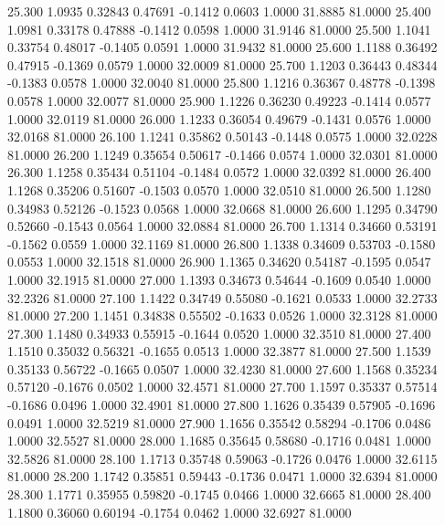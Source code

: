   25.300   1.0935   0.32843   0.47691  -0.1412   0.0603   1.0000  31.8885  81.0000
  25.400   1.0981   0.33178   0.47888  -0.1412   0.0598   1.0000  31.9146  81.0000
  25.500   1.1041   0.33754   0.48017  -0.1405   0.0591   1.0000  31.9432  81.0000
  25.600   1.1188   0.36492   0.47915  -0.1369   0.0579   1.0000  32.0009  81.0000
  25.700   1.1203   0.36443   0.48344  -0.1383   0.0578   1.0000  32.0040  81.0000
  25.800   1.1216   0.36367   0.48778  -0.1398   0.0578   1.0000  32.0077  81.0000
  25.900   1.1226   0.36230   0.49223  -0.1414   0.0577   1.0000  32.0119  81.0000
  26.000   1.1233   0.36054   0.49679  -0.1431   0.0576   1.0000  32.0168  81.0000
  26.100   1.1241   0.35862   0.50143  -0.1448   0.0575   1.0000  32.0228  81.0000
  26.200   1.1249   0.35654   0.50617  -0.1466   0.0574   1.0000  32.0301  81.0000
  26.300   1.1258   0.35434   0.51104  -0.1484   0.0572   1.0000  32.0392  81.0000
  26.400   1.1268   0.35206   0.51607  -0.1503   0.0570   1.0000  32.0510  81.0000
  26.500   1.1280   0.34983   0.52126  -0.1523   0.0568   1.0000  32.0668  81.0000
  26.600   1.1295   0.34790   0.52660  -0.1543   0.0564   1.0000  32.0884  81.0000
  26.700   1.1314   0.34660   0.53191  -0.1562   0.0559   1.0000  32.1169  81.0000
  26.800   1.1338   0.34609   0.53703  -0.1580   0.0553   1.0000  32.1518  81.0000
  26.900   1.1365   0.34620   0.54187  -0.1595   0.0547   1.0000  32.1915  81.0000
  27.000   1.1393   0.34673   0.54644  -0.1609   0.0540   1.0000  32.2326  81.0000
  27.100   1.1422   0.34749   0.55080  -0.1621   0.0533   1.0000  32.2733  81.0000
  27.200   1.1451   0.34838   0.55502  -0.1633   0.0526   1.0000  32.3128  81.0000
  27.300   1.1480   0.34933   0.55915  -0.1644   0.0520   1.0000  32.3510  81.0000
  27.400   1.1510   0.35032   0.56321  -0.1655   0.0513   1.0000  32.3877  81.0000
  27.500   1.1539   0.35133   0.56722  -0.1665   0.0507   1.0000  32.4230  81.0000
  27.600   1.1568   0.35234   0.57120  -0.1676   0.0502   1.0000  32.4571  81.0000
  27.700   1.1597   0.35337   0.57514  -0.1686   0.0496   1.0000  32.4901  81.0000
  27.800   1.1626   0.35439   0.57905  -0.1696   0.0491   1.0000  32.5219  81.0000
  27.900   1.1656   0.35542   0.58294  -0.1706   0.0486   1.0000  32.5527  81.0000
  28.000   1.1685   0.35645   0.58680  -0.1716   0.0481   1.0000  32.5826  81.0000
  28.100   1.1713   0.35748   0.59063  -0.1726   0.0476   1.0000  32.6115  81.0000
  28.200   1.1742   0.35851   0.59443  -0.1736   0.0471   1.0000  32.6394  81.0000
  28.300   1.1771   0.35955   0.59820  -0.1745   0.0466   1.0000  32.6665  81.0000
  28.400   1.1800   0.36060   0.60194  -0.1754   0.0462   1.0000  32.6927  81.0000
